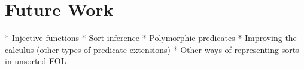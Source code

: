 \section{Future Work}

* Injective functions
* Sort inference
* Polymorphic predicates
* Improving the calculus (other types of predicate extensions)
* Other ways of representing sorts in unsorted FOL

